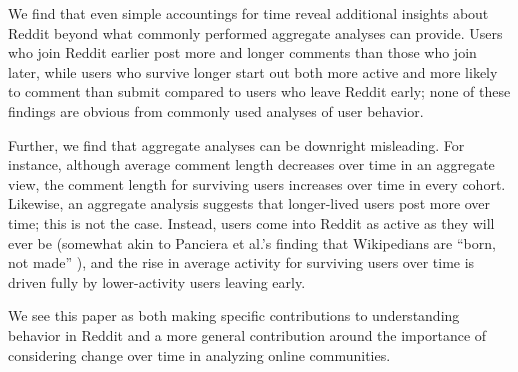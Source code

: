 We find that even simple accountings for time reveal additional insights about Reddit beyond what commonly performed aggregate analyses can provide.  Users who join Reddit earlier post more and longer comments than those who join later, while users who survive longer start out both more active and more likely to comment than submit compared to users who leave Reddit early; none of these findings are obvious from commonly used analyses of user behavior.  

Further, we find that aggregate analyses can be downright misleading.  For instance, although average comment length decreases over time in an aggregate view, the comment length for surviving users increases over time in every cohort.  Likewise, an aggregate analysis suggests that longer-lived users post more over time; this is not the case.  Instead, users come into Reddit as active as they will ever be (somewhat akin to Panciera et al.'s finding that Wikipedians are ``born, not made'' \cite{}), and the rise in average activity for surviving users over time is driven fully by lower-activity users leaving early.     

We see this paper as both making specific contributions to understanding behavior in Reddit and a more general contribution around the importance of considering change over time in analyzing online communities. 




